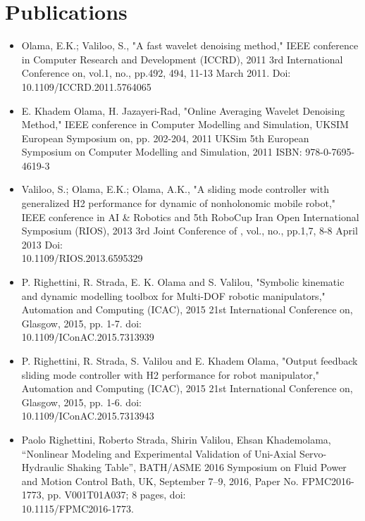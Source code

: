 \documentclass[fontsize=12pt]{tccv}
\begin{document}
	\section{Publications}
	\begin{itemize}
		\item Olama, E.K.; Valiloo, S., "A fast wavelet denoising method," IEEE conference in Computer Research and Development (ICCRD), 2011 3rd International Conference on, vol.1, no., pp.492, 494, 11-13 March 2011. Doi:\\10.1109/ICCRD.2011.5764065
		
		\item E. Khadem Olama, H. Jazayeri-Rad, "Online Averaging Wavelet Denoising Method," IEEE conference in Computer Modelling and Simulation, UKSIM European Symposium on, pp. 202-204, 2011 UKSim 5th  European Symposium on Computer Modelling and Simulation, 2011 ISBN: 978-0-7695-4619-3
		
		\item Valiloo, S.; Olama, E.K.; Olama, A.K., "A sliding mode controller with generalized H2 performance for dynamic of nonholonomic mobile robot," IEEE conference in AI \& Robotics and 5th RoboCup Iran Open International Symposium (RIOS), 2013 3rd Joint Conference of , vol., no., pp.1,7, 8-8 April 2013 Doi:\\ 10.1109/RIOS.2013.6595329
		
		\item P. Righettini, R. Strada, E. K. Olama and S. Valilou, "Symbolic kinematic and dynamic modelling toolbox for Multi-DOF robotic manipulators," Automation and Computing (ICAC), 2015 21st International Conference on, Glasgow, 2015, pp. 1-7. doi:\\10.1109/IConAC.2015.7313939
		
		\item P. Righettini, R. Strada, S. Valilou and E. Khadem Olama, "Output feedback sliding mode controller with H2 performance for robot manipulator," Automation and Computing (ICAC), 2015 21st International Conference on, Glasgow, 2015, pp. 1-6. doi:\\10.1109/IConAC.2015.7313943
		
		\item Paolo Righettini, Roberto Strada, Shirin Valilou, Ehsan Khademolama, “Nonlinear Modeling and Experimental Validation of Uni-Axial Servo-Hydraulic Shaking Table”, BATH/ASME 2016 Symposium on Fluid Power and Motion Control Bath, UK, September 7–9, 2016, Paper No. FPMC2016-1773, pp. V001T01A037; 8 pages, doi:\\10.1115/FPMC2016-1773.
		

\end{itemize}
\end{document}
